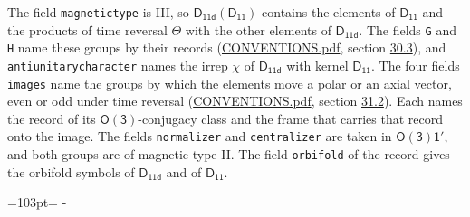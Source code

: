\documentclass[10pt,a4paper]{article}
\newcommand{\needspace}[1]{\par\penalty-100\begingroup\dimen0=#1\relax\dimen2=\pagegoal
  \advance\dimen2-\pagetotal\ifdim\dimen0>\dimen2\relax\ifdim\dimen2>0pt\vfil\break\fi\fi
  \endgroup}
\numberwithin{equation}{section}
\newcommand{\grp}[1]{\mathsf{#1}}
\begin{document}
The field \texttt{magnetictype} is III, so $\grp{D_{11d}}(\grp{D_{11}})$ contains the elements of $\grp{D_{11}}$ and the products of time reversal $\varTheta$ with the other elements of $\grp{D_{11d}}$. The fields \texttt{G} and \texttt{H} name these groups by their records (\href{../../CONVENTIONS.pdf}{CONVENTIONS.pdf}, section \href{../../CONVENTIONS.pdf\#conv.30.3}{30.3}), and \texttt{antiunitarycharacter} names the irrep $\chi$ of $\grp{D_{11d}}$ with kernel $\grp{D_{11}}$. The four fields \texttt{images} name the groups by which the elements move a polar or an axial vector, even or odd under time reversal (\href{../../CONVENTIONS.pdf}{CONVENTIONS.pdf}, section \href{../../CONVENTIONS.pdf\#conv.31.2}{31.2}). Each names the record of its $\grp{O(3)}$-conjugacy class and the frame that carries that record onto the image. The fields \texttt{normalizer} and \texttt{centralizer} are taken in $\grp{O(3)1'}$, and both groups are of magnetic type II. The field \texttt{orbifold} of the record gives the orbifold symbols of $\grp{D_{11d}}$ and of $\grp{D_{11}}$.
\needspace{103pt}
\end{document}
